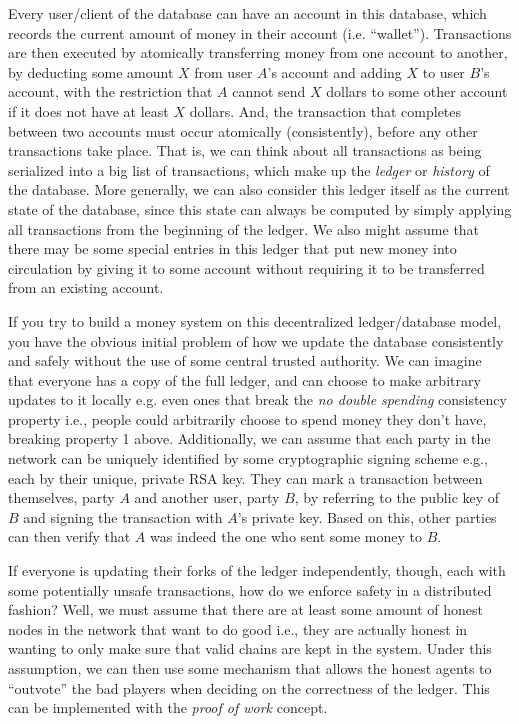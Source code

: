 \documentclass[10pt,a4paper]{article}
\begin{document}
Every user/client of the database can have an account in this database, which records the current amount of money in their account (i.e. ``wallet''). Transactions are then executed by atomically transferring money from one account to another, by deducting some amount $X$ from user $A$'s account and adding $X$ to user $B$'s account, with the restriction that $A$ cannot send $X$ dollars to some other account if it does not have at least $X$ dollars. And, the transaction that completes between two accounts must occur atomically (consistently), before any other transactions take place. That is, we can think about all transactions as being serialized into a big list of transactions, which make up the \textit{ledger} or \textit{history} of the database. More generally, we can also consider this ledger itself as the current state of the database, since this state can always be computed by simply applying all transactions from the beginning of the ledger. We also might assume that there may be some special entries in this ledger that put new money into circulation by giving it to some account without requiring it to be transferred from an existing account.

If you try to build a money system on this decentralized ledger/database model, you have the obvious initial problem of how we update the database consistently and safely without the use of some central trusted authority. We can imagine that everyone has a copy of the full ledger, and can choose to make arbitrary updates to it locally e.g. even ones that break the \textit{no double spending} consistency property i.e., people could arbitrarily choose to spend money they don't have, breaking property 1 above. Additionally, we can assume that each party in the network can be uniquely identified by some cryptographic signing scheme e.g., each by their unique, private RSA key. They can mark a transaction between themselves, party $A$ and another user, party $B$, by referring to the public key of $B$ and signing the transaction with $A$'s private key. Based on this, other parties can then verify that $A$ was indeed the one who sent some money to $B$.

If everyone is updating their forks of the ledger independently, though, each with some potentially unsafe transactions, how do we enforce safety in a distributed fashion? Well, we must assume that there are at least some amount of honest nodes in the network that want to do good i.e., they are actually honest in wanting to only make sure that valid chains are kept in the system. Under this assumption, we can then use some mechanism that allows the honest agents to ``outvote'' the bad players when deciding on the correctness of the ledger. This can be implemented with the \textit{proof of work} concept. 
\end{document}
